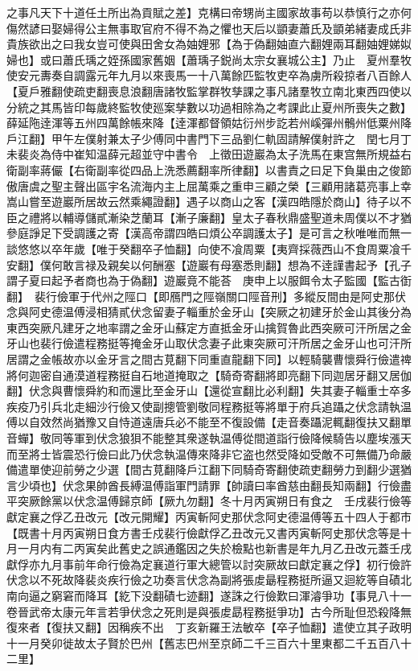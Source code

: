 之事凡天下十道任土所出為貢賦之差】克構曰帝甥尚主國家故事苟以恭慎行之亦何傷然諺曰娶婦得公主無事取官府不得不為之懼也天后以顗妻蕭氏及顗弟緒妻成氏非貴族欲出之曰我女豈可使與田舍女為妯娌邪【為于偽翻妯直六翻娌兩耳翻妯娌娣姒婦也】或曰蕭氏瑀之姪孫國家舊姻【蕭瑀子鋭尚太宗女襄城公主】乃止　夏州羣牧使安元夀奏自調露元年九月以來喪馬一十八萬餘匹監牧吏卒為虜所殺掠者八百餘人【夏戶雅翻使疏吏翻喪息浪翻唐諸牧監掌群牧孳課之事凡諸羣牧立南北東西四使以分統之其馬皆印每歲終監牧使廵案孳數以功過相除為之考課此止夏州所喪失之數】　薛延陁逹渾等五州四萬餘帳來降【逹渾都督領姑衍州步訖若州嵠彈州鶻州低粟州降戶江翻】甲午左僕射兼太子少傅同中書門下三品劉仁軌固請解僕射許之　閏七月丁未裴炎為侍中崔知温薛元超並守中書令　上徵田遊巖為太子洗馬在東宫無所規益右衛副率蔣儼【右衛副率從四品上洗悉薦翻率所律翻】以書責之曰足下負巢由之俊節傲唐虞之聖主聲出區宇名流海内主上屈萬乘之重申三顧之榮【三顧用諸葛亮事上幸嵩山嘗至遊巖所居故云然乘繩證翻】遇子以商山之客【漢四皓隱於商山】待子以不臣之禮將以輔導儲貳漸染芝蘭耳【漸子廉翻】皇太子春秋鼎盛聖道未周僕以不才猶參庭諍足下受調護之寄【漢高帝謂四皓曰煩公卒調護太子】是可言之秋唯唯而無一談悠悠以卒年歲【唯于癸翻卒子恤翻】向使不飡周粟【夷齊採薇西山不食周粟飡千安翻】僕何敢言禄及親矣以何酬塞【遊巖有母塞悉則翻】想為不逹謹書起予【孔子謂子夏曰起予者商也為于偽翻】遊巖竟不能荅　庚申上以服餌令太子監國【監古衘翻】　裴行儉軍于代州之陘口【即鴈門之陘嶺關口陘音刑】多縱反間由是阿史那伏念與阿史德温傅浸相猜貳伏念留妻子輜重於金牙山【突厥之初建牙於金山其後分為東西突厥凡建牙之地率謂之金牙山蘇定方直抵金牙山擒賀魯此西突厥可汗所居之金牙山也裴行儉遣程務挺等掩金牙山取伏念妻子此東突厥可汗所居之金牙山也可汗所居謂之金帳故亦以金牙言之間古莧翻下同重直龍翻下同】以輕騎襲曹懷舜行儉遣禆將何迦密自通漠道程務挺自石地道掩取之【騎奇寄翻將即亮翻下同迦居牙翻又居伽翻】伏念與曹懷舜約和而還比至金牙山【還從宣翻比必利翻】失其妻子輜重士卒多疾疫乃引兵北走細沙行儉又使副摠管劉敬同程務挺等將單于府兵追躡之伏念請執温傅以自效然尚猶豫又自恃道遠唐兵必不能至不復設備【走音奏躡泥輒翻復扶又翻單音蟬】敬同等軍到伏念狼狽不能整其衆遂執温傅從間道詣行儉降候騎告以塵埃漲天而至將士皆震恐行儉曰此乃伏念執温傳來降非它盗也然受降如受敵不可無備乃命嚴備遣單使迎前勞之少選【間古莧翻降戶江翻下同騎奇寄翻使疏吏翻勞力到翻少選猶言少頃也】伏念果帥酋長縛温傅詣軍門請罪【帥讀曰率酋慈由翻長知兩翻】行儉盡平突厥餘黨以伏念温傅歸京師【厥九勿翻】冬十月丙寅朔日有食之　壬戌裴行儉等獻定襄之俘乙丑改元【改元開耀】丙寅斬阿史那伏念阿史德温傅等五十四人于都市【既書十月丙寅朔日食方書壬戍裴行儉獻俘乙丑改元又書丙寅斬阿史那伏念等是十月一月内有二丙寅矣此舊史之誤通鑑因之失於檢點也新書是年九月乙丑改元蓋壬戌獻俘亦九月事前年命行儉為定襄道行軍大總管以討突厥故曰獻定襄之俘】初行儉許伏念以不死故降裴炎疾行儉之功奏言伏念為副將張䖍朂程務挺所逼又迴紇等自磧北南向逼之窮窘而降耳【紇下没翻磧七迹翻】遂誅之行儉歎曰渾濬爭功【事見八十一卷晉武帝太康元年言若爭伏念之死則是與張䖍勗程務挺爭功】古今所耻但恐殺降無復來者【復扶又翻】因稱疾不出　丁亥新羅王法敏卒【卒子恤翻】遣使立其子政明　十一月癸卯徙故太子賢於巴州【舊志巴州至京師二千三百六十里東都二千五百八十二里】

